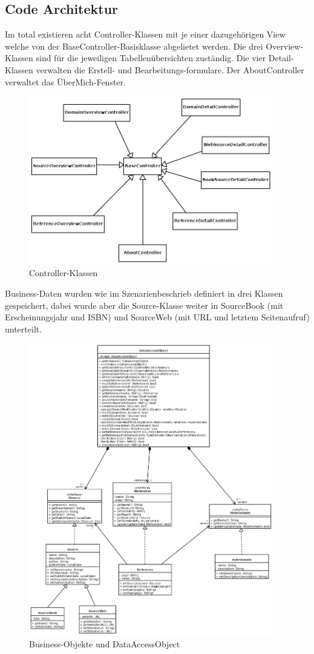 \subsection{Code Architektur}

Im total existieren acht Controller-Klassen mit je einer dazugehörigen View welche von der BaseController-Basisklasse abgelietet werden.
Die drei Overview-Klassen sind für die jeweiligen Tabellenübersichten zuständig. Die vier Detail-Klassen verwalten die Erstell- und Bearbeitungs-formulare. Der AboutController verwaltet das ÜberMich-Fenster.

\begin{figure}[H]
	\centering
	\includegraphics[width=0.95\textwidth]{controller}
	\caption{Controller-Klassen}
\end{figure}

Business-Daten wurden wie im Szenarienbeschrieb definiert in drei Klassen gespeichert, dabei wurde aber die Source-Klasse weiter in SourceBook (mit Erscheinungsjahr und ISBN) und SourceWeb (mit URL und letztem Seitenaufruf) unterteilt.

\begin{figure}[H]
	\centering
	\includegraphics[width=0.95\textwidth]{business_klassen}
	\caption{Business-Objekte und DataAccessObject}
\end{figure}